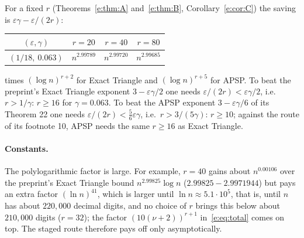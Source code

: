\documentclass[11pt]{article}
\theoremstyle{definition}
\theoremstyle{remark}
\begin{document}
For a fixed $r$ (Theorems~\ref{e:thm:A} and~\ref{e:thm:B}, Corollary~\ref{e:cor:C}) the saving is $\varepsilon\gamma-\varepsilon/(2r)$:
\begin{center}
\begin{tabular}{c|c|c|c}
$(\varepsilon,\gamma)$ & $r=20$ & $r=40$ & $r=80$\\\hline
$(1/18,\ 0.063)$ & $n^{2.99789}$ & $n^{2.99720}$ & $n^{2.99685}$
\end{tabular}
\end{center}
times $(\log n)^{r+2}$ for Exact Triangle and $(\log n)^{r+5}$ for APSP. To beat the preprint's Exact Triangle exponent $3-\varepsilon\gamma/2$ one needs $\varepsilon/(2r)<\varepsilon\gamma/2$, i.e.\ $r>1/\gamma$: $r\ge16$ for $\gamma=0.063$. To beat the APSP exponent $3-\varepsilon\gamma/6$ of its Theorem 22 one needs $\varepsilon/(2r)<\frac56\varepsilon\gamma$, i.e.\ $r>3/(5\gamma)$: $r\ge10$; against the route of its footnote 10, APSP needs the same $r\ge16$ as Exact Triangle.

\paragraph{Constants.} The polylogarithmic factor is large. For example, $r=40$ gains about $n^{0.00106}$ over the preprint's Exact Triangle bound $n^{2.99825}\log n$ ($2.99825-2.9971944$) but pays an extra factor $(\ln n)^{41}$, which is larger until $\ln n\approx5.1\cdot10^5$, that is, until $n$ has about $220{,}000$ decimal digits, and no choice of $r$ brings this below about $210{,}000$ digits ($r=32$); the factor $(10(\nu+2))^{r+1}$ in~\eqref{e:eq:total} comes on top. The staged route therefore pays off only asymptotically.
\end{document}
